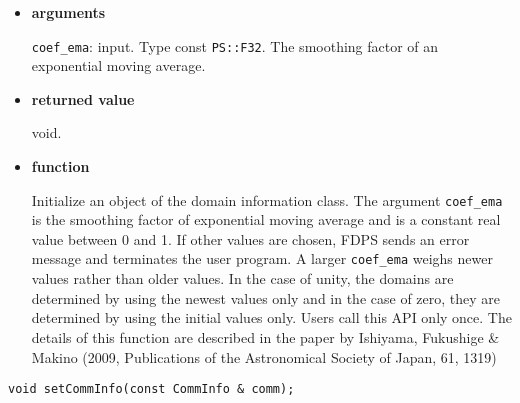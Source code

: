 \begin{itemize}

\item {\bf arguments}

\texttt{coef\_ema}: input. Type const {\tt PS::F32}. The smoothing factor of an
exponential moving average.

\item {\bf returned value}

void.

\item {\bf function}

Initialize an object of the domain information class. The argument
\texttt{coef\_ema} is the smoothing factor of exponential moving
average and is a constant real value between 0 and 1. If other values
are chosen, FDPS sends an error message and terminates the user
program.  A larger \texttt{coef\_ema} weighs newer values rather
than older values. In the case of unity, the domains are determined by
using the newest values only and in the case of zero, they are
determined by using the initial values only. Users call this API only
once. The details of this function are described in the paper by
Ishiyama, Fukushige \& Makino (2009, Publications of the Astronomical
Society of Japan, 61, 1319)


\end{itemize}



\begin{screen}
\begin{verbatim}
void setCommInfo(const CommInfo & comm);
\end{verbatim}
\end{screen}

